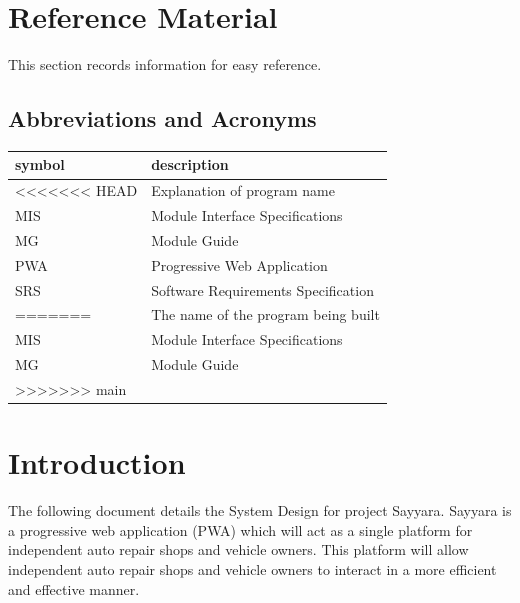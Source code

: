 \documentclass[12pt, titlepage]{article}
\begin{document}
\newpage

\section{Reference Material}

This section records information for easy reference.

\subsection{Abbreviations and Acronyms}

\begin{tabular}{l l}
	\toprule
	\textbf{symbol} & \textbf{description}                \\
	\midrule
	<<<<<<< HEAD
	\progname       & Explanation of program name         \\
	MIS             & Module Interface Specifications     \\
	MG              & Module Guide                        \\
	PWA             & Progressive Web Application         \\
	SRS             & Software Requirements Specification \\
	=======
	\progname       & The name of the program being built \\
	MIS             & Module Interface Specifications     \\
	MG              & Module Guide                        \\
	>>>>>>> main
	\bottomrule
\end{tabular}

\newpage

\tableofcontents

\newpage

\listoftables

\listoffigures

\newpage


\section{Introduction}

The following document details the System Design for project Sayyara. Sayyara is a progressive web
application (PWA) which will act as a single platform for independent auto repair shops and vehicle
owners. This platform will allow independent auto repair shops and vehicle owners to interact in a
more efficient and effective manner.
\end{document}
